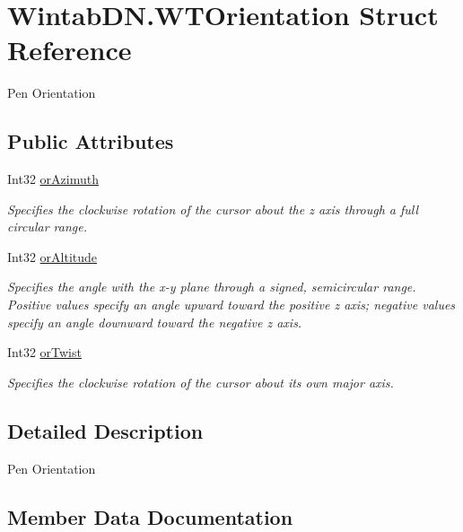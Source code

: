 \hypertarget{struct_wintab_d_n_1_1_w_t_orientation}{}\section{Wintab\+D\+N.\+W\+T\+Orientation Struct Reference}
\label{struct_wintab_d_n_1_1_w_t_orientation}


Pen Orientation  


\subsection*{Public Attributes}
\begin{DoxyCompactItemize}
\item 
Int32 \mbox{\hyperlink{struct_wintab_d_n_1_1_w_t_orientation_a15a77946f970b8661984fc999c52688c}{or\+Azimuth}}
\begin{DoxyCompactList}\small\item\em Specifies the clockwise rotation of the cursor about the z axis through a full circular range. \end{DoxyCompactList}\item 
Int32 \mbox{\hyperlink{struct_wintab_d_n_1_1_w_t_orientation_ad8836d4567264b5387f5786a1679a1f5}{or\+Altitude}}
\begin{DoxyCompactList}\small\item\em Specifies the angle with the x-\/y plane through a signed, semicircular range. ~\newline
Positive values specify an angle upward toward the positive z axis; negative values specify an angle downward toward the negative z axis. \end{DoxyCompactList}\item 
Int32 \mbox{\hyperlink{struct_wintab_d_n_1_1_w_t_orientation_a14362dcbf64d7fb048c523a4bbbd9705}{or\+Twist}}
\begin{DoxyCompactList}\small\item\em Specifies the clockwise rotation of the cursor about its own major axis. \end{DoxyCompactList}\end{DoxyCompactItemize}


\subsection{Detailed Description}
Pen Orientation 



\subsection{Member Data Documentation}
\mbox{\label{struct_wintab_d_n_1_1_w_t_orientation_ad8836d4567264b5387f5786a1679a1f5}} 
